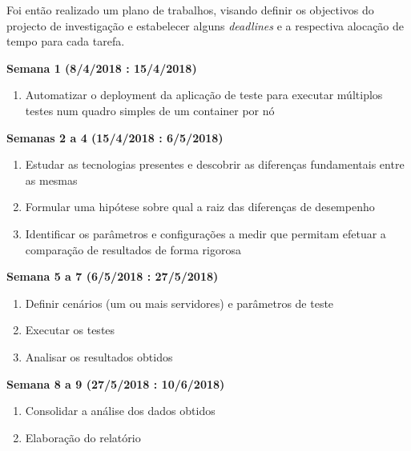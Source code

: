 Foi então realizado um plano de trabalhos, visando definir os objectivos do projecto de investigação e estabelecer alguns \textit{deadlines} e a respectiva alocação de tempo para cada tarefa.
\vspace{5mm}

\textbf{Semana 1 (8/4/2018 : 15/4/2018)}

\begin{enumerate}
\item Automatizar o deployment da aplicação de teste para  executar múltiplos testes num quadro simples de um container por nó
\end{enumerate}

\textbf{Semanas 2 a 4 (15/4/2018 : 6/5/2018)}


\begin{enumerate}
\item Estudar as tecnologias presentes e descobrir as diferenças fundamentais entre as mesmas
\item Formular uma hipótese sobre qual a  raiz das diferenças de desempenho
\item Identificar os parâmetros e configurações a medir que permitam efetuar a comparação de resultados de forma rigorosa

\end{enumerate}

\textbf{Semana 5 a 7 (6/5/2018 : 27/5/2018)}

\begin{enumerate}
\item Definir cenários (um ou mais servidores) e parâmetros de teste
\item Executar os testes
\item Analisar os resultados obtidos
\end{enumerate}


\textbf{Semana 8 a 9 (27/5/2018 : 10/6/2018)}

\begin{enumerate}
\item Consolidar a análise dos dados obtidos
\item Elaboração do relatório
\end{enumerate}
